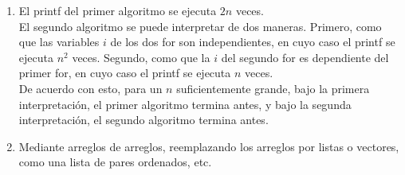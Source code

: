 \documentclass[letter,12pt,oneside]{book}
\theoremstyle{definition}
\begin{document}
\begin{enumerate}
    \item El printf del primer algoritmo se ejecuta $2n$ veces.\\
    El segundo algoritmo se puede interpretar de dos maneras. Primero, como que las variables $i$ de los dos for son independientes, en cuyo caso el printf se ejecuta $n^2$ veces. Segundo, como que la $i$ del segundo for es dependiente del primer for, en cuyo caso el printf se ejecuta $n$ veces.\\
    De acuerdo con esto, para un $n$ suficientemente grande, bajo la primera interpretación, el primer algoritmo termina antes, y bajo la segunda interpretación, el segundo algoritmo termina antes.
    \item Mediante arreglos de arreglos, reemplazando los arreglos por listas o vectores, como una lista de pares ordenados, etc.
    \end{enumerate}
\end{document}
